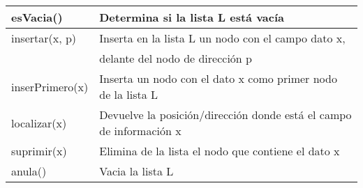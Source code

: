 \documentclass{article}
\begin{document}
    \begin{center}
        \begin{tabular}{|l|l|}
            \hline
            esVacia() & Determina si la lista L está vacía \\
            \hline
            insertar(x, p) & Inserta en la lista L un nodo con el campo dato x, \\&delante del nodo de dirección p \\
            \hline
            inserPrimero(x) & Inserta un nodo con el dato x como primer nodo de la lista L \\
            \hline
            localizar(x) & Devuelve la posición/dirección donde está el campo de información x \\
            \hline
            suprimir(x) & Elimina de la lista el nodo que contiene el dato x \\
            \hline
            anula() & Vacia la lista L \\
            \hline
        \end{tabular}
    \end{center}
\end{document}
